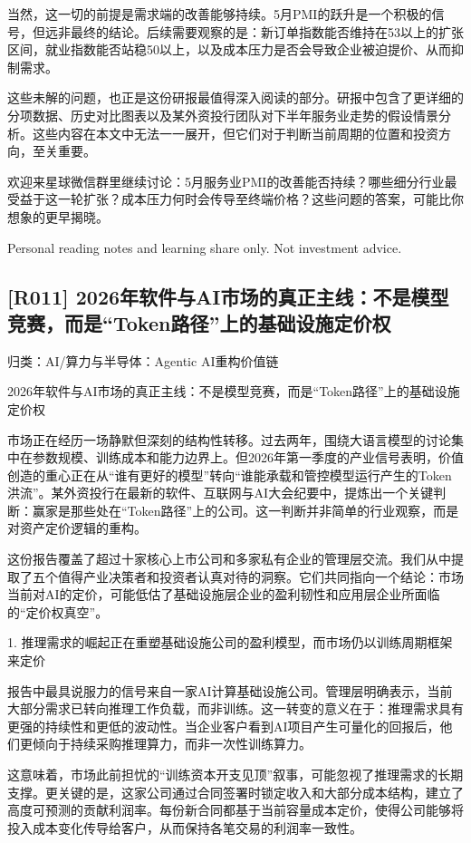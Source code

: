 \documentclass[11pt]{ctexart}
\begin{document}
当然，这一切的前提是需求端的改善能够持续。5月PMI的跃升是一个积极的信号，但远非最终的结论。后续需要观察的是：新订单指数能否维持在53以上的扩张区间，就业指数能否站稳50以上，以及成本压力是否会导致企业被迫提价、从而抑制需求。

这些未解的问题，也正是这份研报最值得深入阅读的部分。研报中包含了更详细的分项数据、历史对比图表以及某外资投行团队对下半年服务业走势的假设情景分析。这些内容在本文中无法一一展开，但它们对于判断当前周期的位置和投资方向，至关重要。

欢迎来星球微信群里继续讨论：5月服务业PMI的改善能否持续？哪些细分行业最受益于这一轮扩张？成本压力何时会传导至终端价格？这些问题的答案，可能比你想象的更早揭晓。

Personal reading notes and learning share only. Not investment advice.

\subsection{[R011] 2026年软件与AI市场的真正主线：不是模型竞赛，而是“Token路径”上的基础设施定价权}
{\small\color{refgray}归类：AI/算力与半导体：Agentic AI重构价值链}

2026年软件与AI市场的真正主线：不是模型竞赛，而是“Token路径”上的基础设施定价权

市场正在经历一场静默但深刻的结构性转移。过去两年，围绕大语言模型的讨论集中在参数规模、训练成本和能力边界上。但2026年第一季度的产业信号表明，价值创造的重心正在从“谁有更好的模型”转向“谁能承载和管控模型运行产生的Token洪流”。某外资投行在最新的软件、互联网与AI大会纪要中，提炼出一个关键判断：赢家是那些处在“Token路径”上的公司。这一判断并非简单的行业观察，而是对资产定价逻辑的重构。

这份报告覆盖了超过十家核心上市公司和多家私有企业的管理层交流。我们从中提取了五个值得产业决策者和投资者认真对待的洞察。它们共同指向一个结论：市场当前对AI的定价，可能低估了基础设施层企业的盈利韧性和应用层企业所面临的“定价权真空”。

1. 推理需求的崛起正在重塑基础设施公司的盈利模型，而市场仍以训练周期框架来定价

报告中最具说服力的信号来自一家AI计算基础设施公司。管理层明确表示，当前大部分需求已转向推理工作负载，而非训练。这一转变的意义在于：推理需求具有更强的持续性和更低的波动性。当企业客户看到AI项目产生可量化的回报后，他们更倾向于持续采购推理算力，而非一次性训练算力。

这意味着，市场此前担忧的“训练资本开支见顶”叙事，可能忽视了推理需求的长期支撑。更关键的是，这家公司通过合同签署时锁定收入和大部分成本结构，建立了高度可预测的贡献利润率。每份新合同都基于当前容量成本定价，使得公司能够将投入成本变化传导给客户，从而保持各笔交易的利润率一致性。
\end{document}
